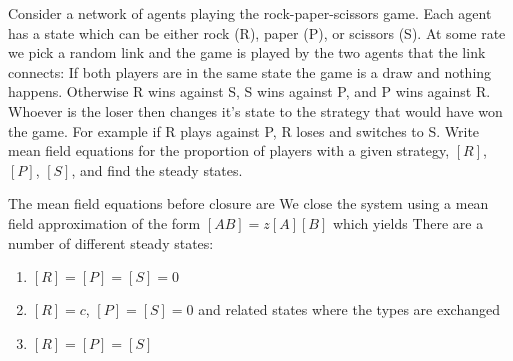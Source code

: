 
Consider a network of agents playing the rock-paper-scissors game. Each agent has a state which can be either rock (R), paper (P), or scissors (S). At some rate we pick a random link and the game is played by the two agents that the link connects: If both players are in the same state the game is a draw and nothing happens. Otherwise R wins against S, S wins against P, and P wins against R. Whoever is the loser then changes it's state to the strategy that would have won the game. For example if R plays against P, R loses and switches to S. Write mean field equations for the proportion of players with a given strategy, $[R]$, $[P]$, $[S]$, and find the steady states.

\solution
The mean field equations before closure are 
\eqa{
 [\dot{R}]&=&[SP]-[RP]\\{}
 [\dot{S}]&=&[PR]-[SR]\\{}
 [\dot{P}]&=&[RS]-[PS]
}
We close the system using a mean field approximation of the form $[AB]=z[A][B]$ which yields 
There are a number of different steady states:
\begin{enumerate}
\item $[R]=[P]=[S]=0$
\item $[R]=c$, $[P]=[S]=0$ and related states where the types are exchanged
\item $[R]=[P]=[S]$
\end{enumerate}

